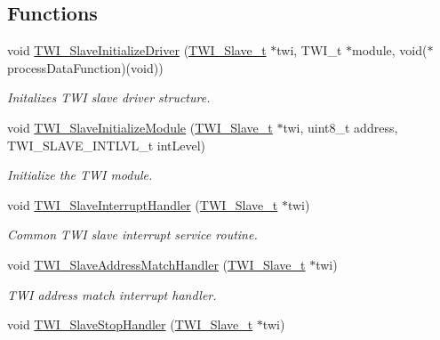 \subsection*{Functions}
\begin{DoxyCompactItemize}
\item 
void \hyperlink{group__group__xmega__drivers__twi__twis_ga14b9327d32373a2481e23bec041cbd7e}{T\-W\-I\-\_\-\-Slave\-Initialize\-Driver} (\hyperlink{group__group__xmega__drivers__twi__twis_gabf4af194b6abde4d5fce8ded2aa33c18}{T\-W\-I\-\_\-\-Slave\-\_\-t} $\ast$twi, T\-W\-I\-\_\-t $\ast$module, void($\ast$process\-Data\-Function)(void))
\begin{DoxyCompactList}\small\item\em Initalizes T\-W\-I slave driver structure. \end{DoxyCompactList}\item 
void \hyperlink{group__group__xmega__drivers__twi__twis_ga7516e604cb0aacddd8d1016a54039752}{T\-W\-I\-\_\-\-Slave\-Initialize\-Module} (\hyperlink{group__group__xmega__drivers__twi__twis_gabf4af194b6abde4d5fce8ded2aa33c18}{T\-W\-I\-\_\-\-Slave\-\_\-t} $\ast$twi, uint8\-\_\-t address, T\-W\-I\-\_\-\-S\-L\-A\-V\-E\-\_\-\-I\-N\-T\-L\-V\-L\-\_\-t int\-Level)
\begin{DoxyCompactList}\small\item\em Initialize the T\-W\-I module. \end{DoxyCompactList}\item 
void \hyperlink{group__group__xmega__drivers__twi__twis_ga0b140fb1b0b3f204e5c748c5f585fbb2}{T\-W\-I\-\_\-\-Slave\-Interrupt\-Handler} (\hyperlink{group__group__xmega__drivers__twi__twis_gabf4af194b6abde4d5fce8ded2aa33c18}{T\-W\-I\-\_\-\-Slave\-\_\-t} $\ast$twi)
\begin{DoxyCompactList}\small\item\em Common T\-W\-I slave interrupt service routine. \end{DoxyCompactList}\item 
void \hyperlink{group__group__xmega__drivers__twi__twis_gab96f35de69dbc4fa7dcd0ca605e79323}{T\-W\-I\-\_\-\-Slave\-Address\-Match\-Handler} (\hyperlink{group__group__xmega__drivers__twi__twis_gabf4af194b6abde4d5fce8ded2aa33c18}{T\-W\-I\-\_\-\-Slave\-\_\-t} $\ast$twi)
\begin{DoxyCompactList}\small\item\em T\-W\-I address match interrupt handler. \end{DoxyCompactList}\item 
void \hyperlink{group__group__xmega__drivers__twi__twis_gad41cfd81c56ee94ef6d147221881b131}{T\-W\-I\-\_\-\-Slave\-Stop\-Handler} (\hyperlink{group__group__xmega__drivers__twi__twis_gabf4af194b6abde4d5fce8ded2aa33c18}{T\-W\-I\-\_\-\-Slave\-\_\-t} $\ast$twi)

\end{DoxyCompactItemize}
